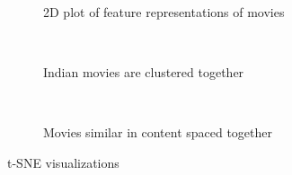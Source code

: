 \documentclass{article} %
\begin{document}
\begin{figure}[ht]
	\centering
	\begin{subfigure}[b]{0.45\textwidth}
	\caption{2D plot of feature representations of movies}
	\label{fig:lda-movies}
	\end{subfigure}
	~
	\begin{subfigure}[b]{0.45\textwidth}
	\caption{Indian movies are clustered together}
	\label{fig:indian-movies}
	\end{subfigure}
	~
	\begin{subfigure}[b]{0.45\textwidth}
	\caption{Movies similar in content spaced together}
	\label{fig:close-movies}
	\end{subfigure}
\caption{t-SNE visualizations}
\label{fig:models}
\end{figure}
\end{document}
